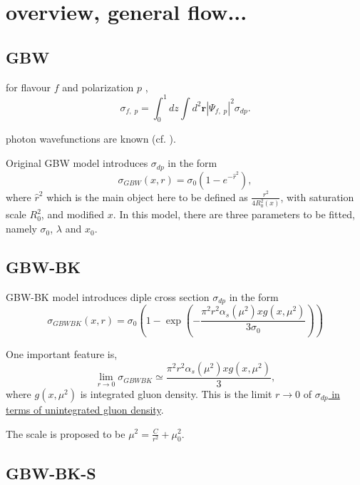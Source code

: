 \section{overview, general flow...}


\subsection{GBW\cite{gbw1998}}
for flavour $f$ and polarization $p$ \cite{gbw1998} \cite{cambqcd},
\begin{equation}
\sigma_{f,\;p}=\int_{0}^{1} d z \int d^2\mathbf{r}|\Psi_{f,\;p}|^2 \sigma_{dp}.
\end{equation}

photon wavefunctions are known (cf.  \cite{gbw1998}).

Original GBW model introduces $\sigma_{dp}$ in the form
\begin{equation}
\sigma_{GBW} (x, r )=\sigma_0 (1-e^{-\hat{r}^2}),
\end{equation}
where $\hat{r}^2$ which is the main object here to be defined as $\frac{r^2}{4 R^2_0(x)}$, with saturation scale \hyperlink{saturationscaleGBW}{$R^2_0$}, and modified \hyperlink{modifiedx}{$x$}.
In this model, there are three parameters to be fitted, namely $\sigma_0$, $\lambda$ and $x_0$.


\subsection{GBW-BK \cite{gbk2002}}
GBW-BK model introduces diple cross section $\sigma_{dp}$ in the form
\begin{equation}
\sigma_{GBWBK}(x,r)=\sigma_0\left(1-\exp\left(-\frac{\pi^2 r^2\alpha_s(\mu^2) x g(x,\mu^2)}{3\sigma_0}\right) \right)
\end{equation}

One important feature is,
\begin{equation}
\lim_{r \rightarrow 0}\sigma_{GBWBK} \simeq  \frac{\pi^2 r^2\alpha_s(\mu^2) x g(x,\mu^2)}{3},
\end{equation}
where $g(x,\mu^2)$ is integrated gluon density. This is the limit $r \rightarrow 0$ of \hyperlink{ugd}{ $\sigma_{dp}$ in terms of unintegrated gluon density}.

The scale is proposed to be $\mu^2=\frac{C}{r^2}+{\mu^2_0}$.  
 





\subsection{GBW-BK-S}




